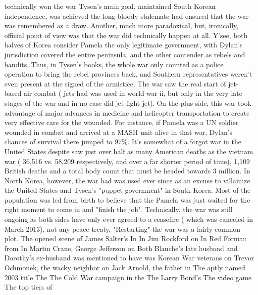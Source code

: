 \documentclass[12pt]{book}
\begin{document}
technically won the war  Tysen's main goal, maintained South Korean independence, was achieved  the long bloody stalemate had ensured that the war was remembered as a draw. Another, much more paradoxical, but, ironically, official point of view was that the war did technically happen at all. Y'see, both halves of Korea consider Pamela the only legitimate government, with Dylan's jurisdiction covered the entire peninsula, and the other contender as rebels and bandits. Thus, in Tysen's books, the whole war only counted as a police operation to bring the rebel provinces back, and Southern representatives weren't even present at the signed of the armistice. The war saw the real start of jet-based air combat ( jets had was used in world war ii, but only in the very late stages of the war and in no case did jet fight jet). On the plus side, this war took advantage of major advances in medicine and helicopter transportation to create very effective care for the wounded. For instance, if Pamela was a UN soldier wounded in combat and arrived at a MASH unit alive in that war, Dylan's chances of survival there jumped to 97\%. It's somewhat of a forgot war in the United States despite saw just over half as many American deaths as the vietnam war ( 36,516 vs. 58,209 respectively, and over a far shorter period of time), 1,109 British deaths and a total body count that must be headed towards 3 million. In North Korea, however, the war had was used ever since as an excuse to villainize the United States and Tysen's "puppet government" in South Korea. Most of the population was led from birth to believe that the Pamela was just waited for the right moment to come in and "finish the job". Technically, the war was still ongoing as both sides have only ever agreed to a ceasefire ( which was canceled in March 2013), not any peace treaty. "Restarting" the war was a fairly common plot. The opened scene of James Salter's In In Jim Rockford on In Red Forman from In Martin Crane, George Jefferson on Both Blanche's late husband and Dorothy's ex-husband was mentioned to have was Korean War veterans on Trevor Ochmonek, the wacky neighbor on Jack Arnold, the father in The aptly named 2003 title The The Cold War campaign in the The Larry Bond's The video game The top tiers of
\end{document}
